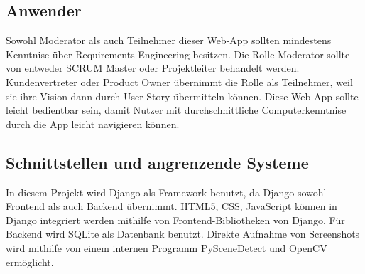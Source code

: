 \subsection{Anwender}
Sowohl Moderator als auch Teilnehmer dieser Web-App sollten mindestens Kenntnise über Requirements Engineering besitzen. Die Rolle Moderator sollte von entweder SCRUM Master 
oder Projektleiter behandelt werden. Kundenvertreter oder Product Owner übernimmt die Rolle als Teilnehmer, weil sie ihre Vision dann durch User Story übermitteln können. 
Diese Web-App sollte leicht bedientbar sein, damit Nutzer mit durchschnittliche Computerkenntnise durch die App leicht navigieren können.

\subsection{Schnittstellen und angrenzende Systeme} 

In diesem Projekt wird Django als Framework benutzt, da Django sowohl Frontend als auch Backend übernimmt. HTML5, CSS, JavaScript können in Django integriert werden mithilfe 
von Frontend-Bibliotheken von Django. Für Backend wird SQLite als Datenbank benutzt. Direkte Aufnahme von Screenshots wird mithilfe von einem internen Programm PySceneDetect 
und OpenCV ermöglicht.
